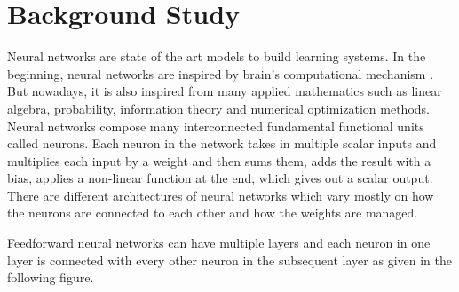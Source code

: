\documentclass[a4paper, 11pt]{article}
\begin{document}

  





\section{Background Study}

Neural networks are state of the art models to build learning systems. In the beginning, neural networks are inspired by brain's computational mechanism \cite{McCulloch1943}. But nowadays, it is also inspired from many applied mathematics such as linear algebra, probability, information theory and numerical optimization methods\cite{Goodfellow2016}. Neural networks compose many interconnected fundamental functional units called neurons. Each neuron in the network takes in multiple scalar inputs and multiplies each input by a weight and then sums them, adds the result with a bias, applies a non-linear function at the end, which gives out a scalar output. There are different architectures of neural networks which vary mostly on how the neurons are connected to each other and how the weights are managed. 

Feedforward neural networks \cite{Svozil1997} can have multiple layers and each neuron in one layer is connected with every other neuron in the subsequent layer as given in the following figure. 
\end{document}

